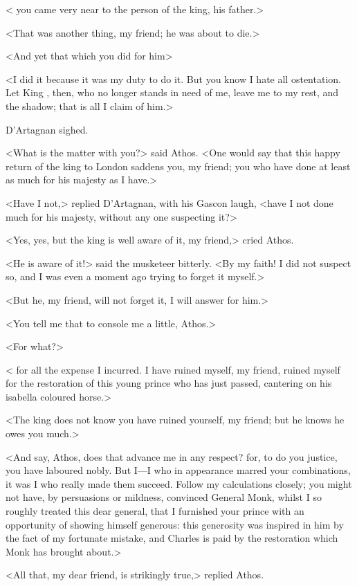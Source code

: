 < you came very near to the person of the king, his father.>

<That was another thing, my friend; he was about to die.>

<And yet that which you did for him\longdash>

<I did it because it was my duty to do it. But you know I hate all ostentation. Let King , then, who no longer stands in need of me, leave me to my rest, and the shadow; that is all I claim of him.>

D'Artagnan sighed.

<What is the matter with you?> said Athos. <One would say that this happy return of the king to London saddens you, my friend; you who have done at least as much for his majesty as I have.>

<Have I not,> replied D'Artagnan, with his Gascon laugh, <have I not done much for his majesty, without any one suspecting it?>

<Yes, yes, but the king is well aware of it, my friend,> cried Athos.

<He is aware of it!> said the musketeer bitterly. <By my faith! I did not suspect so, and I was even a moment ago trying to forget it myself.>

<But he, my friend, will not forget it, I will answer for him.>

<You tell me that to console me a little, Athos.>

<For what?>

< for all the expense I incurred. I have ruined myself, my friend, ruined myself for the restoration of this young prince who has just passed, cantering on his isabella coloured horse.>

<The king does not know you have ruined yourself, my friend; but he knows he owes you much.>

<And say, Athos, does that advance me in any respect? for, to do you justice, you have laboured nobly. But I—I who in appearance marred your combinations, it was I who really made them succeed. Follow my calculations closely; you might not have, by persuasions or mildness, convinced General Monk, whilst I so roughly treated this dear general, that I furnished your prince with an opportunity of showing himself generous: this generosity was inspired in him by the fact of my fortunate mistake, and Charles is paid by the restoration which Monk has brought about.>

<All that, my dear friend, is strikingly true,> replied Athos.

